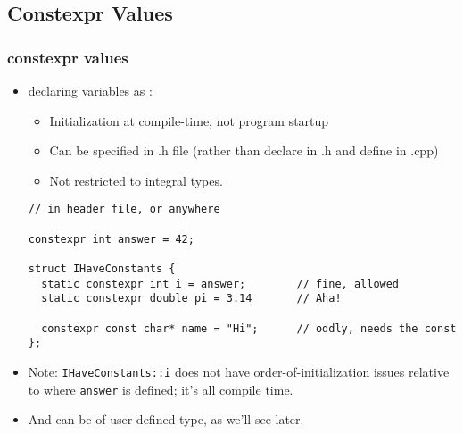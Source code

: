 \subsection{Constexpr Values}
\begin{frame}[fragile,t]
\frametitle{constexpr values}
\begin{itemize}[<+->]
\item declaring variables as \cexpr:
  \begin{itemize}
  \item Initialization at compile-time, not program startup
  \item Can be specified in .h file (rather than declare in .h and
    define in .cpp)
  \item Not restricted to integral types.
  \end{itemize}
\pause
{\scriptsize\begin{verbatim}
// in header file, or anywhere

constexpr int answer = 42;

struct IHaveConstants {
  static constexpr int i = answer;        // fine, allowed
  static constexpr double pi = 3.14       // Aha!

  constexpr const char* name = "Hi";      // oddly, needs the const
};

\end{verbatim}
}
\item Note: \texttt{IHaveConstants::i} does not have
  order-of-initialization issues relative to where \texttt{answer} is
  defined; it's all compile time.
\item And can be of user-defined type, as we'll see later.  
\end{itemize}

\end{frame}




